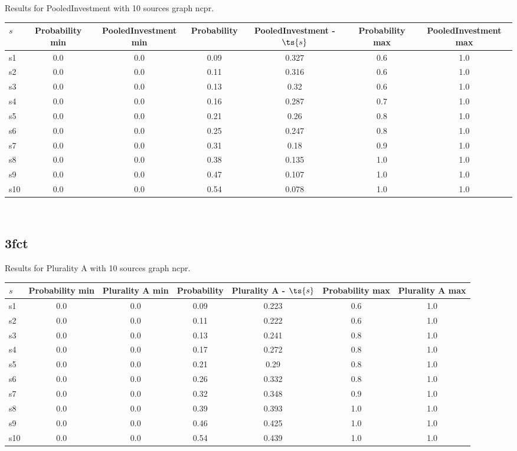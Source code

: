 \documentclass{article}
\begin{document}
\noindent Results for PooledInvestment with 10 sources graph ncpr.

\noindent\begin{tabular}{|l|c|c|c|c|c|c|}
\hline
$s$& Probability min & PooledInvestment min & Probability & PooledInvestment - $\ts{s}$ & Probability max & PooledInvestment max\\
\hline
s1 &0.0 & 0.0 & 0.09 & 0.327 & 0.6 & 1.0\\
\hline
s2 &0.0 & 0.0 & 0.11 & 0.316 & 0.6 & 1.0\\
\hline
s3 &0.0 & 0.0 & 0.13 & 0.32 & 0.6 & 1.0\\
\hline
s4 &0.0 & 0.0 & 0.16 & 0.287 & 0.7 & 1.0\\
\hline
s5 &0.0 & 0.0 & 0.21 & 0.26 & 0.8 & 1.0\\
\hline
s6 &0.0 & 0.0 & 0.25 & 0.247 & 0.8 & 1.0\\
\hline
s7 &0.0 & 0.0 & 0.31 & 0.18 & 0.9 & 1.0\\
\hline
s8 &0.0 & 0.0 & 0.38 & 0.135 & 1.0 & 1.0\\
\hline
s9 &0.0 & 0.0 & 0.47 & 0.107 & 1.0 & 1.0\\
\hline
s10 &0.0 & 0.0 & 0.54 & 0.078 & 1.0 & 1.0\\
\hline
\end{tabular}\\

\newpage

\subsection{3fct}

\noindent Results for Plurality A with 10 sources graph ncpr.

\noindent\begin{tabular}{|l|c|c|c|c|c|c|}
\hline
$s$& Probability min & Plurality A min & Probability & Plurality A - $\ts{s}$ & Probability max & Plurality A max\\
\hline
s1 &0.0 & 0.0 & 0.09 & 0.223 & 0.6 & 1.0\\
\hline
s2 &0.0 & 0.0 & 0.11 & 0.222 & 0.6 & 1.0\\
\hline
s3 &0.0 & 0.0 & 0.13 & 0.241 & 0.8 & 1.0\\
\hline
s4 &0.0 & 0.0 & 0.17 & 0.272 & 0.8 & 1.0\\
\hline
s5 &0.0 & 0.0 & 0.21 & 0.29 & 0.8 & 1.0\\
\hline
s6 &0.0 & 0.0 & 0.26 & 0.332 & 0.8 & 1.0\\
\hline
s7 &0.0 & 0.0 & 0.32 & 0.348 & 0.9 & 1.0\\
\hline
s8 &0.0 & 0.0 & 0.39 & 0.393 & 1.0 & 1.0\\
\hline
s9 &0.0 & 0.0 & 0.46 & 0.425 & 1.0 & 1.0\\
\hline
s10 &0.0 & 0.0 & 0.54 & 0.439 & 1.0 & 1.0\\
\hline
\end{tabular}\\
\end{document}
